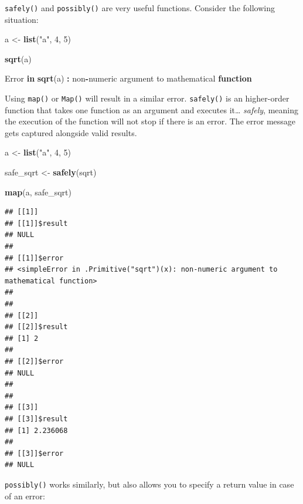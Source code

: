 \documentclass[]{gitbook}
\newenvironment{Shaded}{\begin{snugshade}}{\end{snugshade}}
\newcommand{\ControlFlowTok}[1]{\textcolor[rgb]{0.13,0.29,0.53}{\textbf{#1}}}
\newcommand{\DecValTok}[1]{\textcolor[rgb]{0.00,0.00,0.81}{#1}}
\newcommand{\KeywordTok}[1]{\textcolor[rgb]{0.13,0.29,0.53}{\textbf{#1}}}
\newcommand{\NormalTok}[1]{#1}
\newcommand{\OperatorTok}[1]{\textcolor[rgb]{0.81,0.36,0.00}{\textbf{#1}}}
\newcommand{\StringTok}[1]{\textcolor[rgb]{0.31,0.60,0.02}{#1}}
\begin{document}
\texttt{safely()} and \texttt{possibly()} are very useful functions. Consider the following situation:

\begin{Shaded}
\begin{Highlighting}[]
\NormalTok{a <-}\StringTok{ }\KeywordTok{list}\NormalTok{(}\StringTok{"a"}\NormalTok{, }\DecValTok{4}\NormalTok{, }\DecValTok{5}\NormalTok{)}

\KeywordTok{sqrt}\NormalTok{(a)}
\end{Highlighting}
\end{Shaded}

\begin{Shaded}
\begin{Highlighting}[]
\NormalTok{Error }\ControlFlowTok{in} \KeywordTok{sqrt}\NormalTok{(a) }\OperatorTok{:}\StringTok{ }\NormalTok{non}\OperatorTok{-}\NormalTok{numeric argument to mathematical }\ControlFlowTok{function}
\end{Highlighting}
\end{Shaded}

Using \texttt{map()} or \texttt{Map()} will result in a similar error. \texttt{safely()} is an higher-order function that
takes one function as an argument and executes it\ldots{} \emph{safely}, meaning the execution of the function
will not stop if there is an error. The error message gets captured alongside valid results.

\begin{Shaded}
\begin{Highlighting}[]
\NormalTok{a <-}\StringTok{ }\KeywordTok{list}\NormalTok{(}\StringTok{"a"}\NormalTok{, }\DecValTok{4}\NormalTok{, }\DecValTok{5}\NormalTok{)}

\NormalTok{safe_sqrt <-}\StringTok{ }\KeywordTok{safely}\NormalTok{(sqrt)}

\KeywordTok{map}\NormalTok{(a, safe_sqrt)}
\end{Highlighting}
\end{Shaded}

\begin{verbatim}
## [[1]]
## [[1]]$result
## NULL
## 
## [[1]]$error
## <simpleError in .Primitive("sqrt")(x): non-numeric argument to mathematical function>
## 
## 
## [[2]]
## [[2]]$result
## [1] 2
## 
## [[2]]$error
## NULL
## 
## 
## [[3]]
## [[3]]$result
## [1] 2.236068
## 
## [[3]]$error
## NULL
\end{verbatim}

\texttt{possibly()} works similarly, but also allows you to specify a return value in case of an error:
\end{document}

